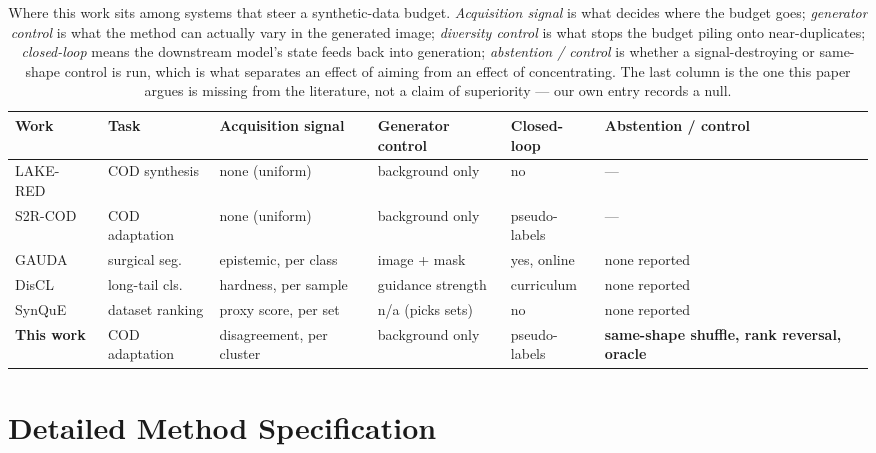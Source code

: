\documentclass{article} %
\begin{document}
\begin{table}[t]
\caption{Where this work sits among systems that steer a synthetic-data budget. \emph{Acquisition
signal} is what decides where the budget goes; \emph{generator control} is what the method can
actually vary in the generated image; \emph{diversity control} is what stops the budget piling onto
near-duplicates; \emph{closed-loop} means the downstream model's state feeds back into generation;
\emph{abstention / control} is whether a signal-destroying or same-shape control is run, which is
what separates an effect of aiming from an effect of concentrating. The last column is the one this
paper argues is missing from the literature, not a claim of superiority --- our own entry records a
null.}
\label{tab:closest}
\begin{center}
\small
\setlength{\tabcolsep}{3pt}
\footnotesize
\begin{tabular}{@{}lp{1.75cm}p{1.9cm}p{1.75cm}p{1.35cm}p{1.9cm}@{}}
\toprule
Work & Task & Acquisition signal & Generator control & Closed-loop & Abstention / control \\
\midrule
LAKE-RED~\cite{zhao2024lakered} & COD synthesis & none (uniform) & background only & no & --- \\
S2R-COD~\cite{luo2025s2rcod} & COD adaptation & none (uniform) & background only & pseudo-labels & --- \\
GAUDA~\cite{frisch2025gauda} & surgical seg. & epistemic, per class & image + mask & yes, online & none reported \\
DisCL~\cite{liang2025discl} & long-tail cls. & hardness, per sample & guidance strength & curriculum & none reported \\
SynQuE~\cite{chen2025synque} & dataset ranking & proxy score, per set & n/a (picks sets) & no & none reported \\
\midrule
\textbf{This work} & COD adaptation & disagreement, per cluster & background only & pseudo-labels &
\textbf{same-shape shuffle, rank reversal, oracle} \\
\bottomrule
\end{tabular}
\end{center}
\end{table}

\section{Detailed Method Specification}
\label{app:method}
\end{document}
